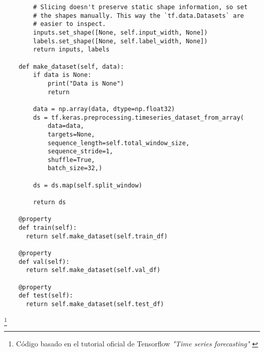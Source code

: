 \begin{verbatim}
        # Slicing doesn't preserve static shape information, so set
        # the shapes manually. This way the `tf.data.Datasets` are
        # easier to inspect.
        inputs.set_shape([None, self.input_width, None])
        labels.set_shape([None, self.label_width, None])
        return inputs, labels
    
    def make_dataset(self, data):
        if data is None:
            print("Data is None")
            return
    
        data = np.array(data, dtype=np.float32)
        ds = tf.keras.preprocessing.timeseries_dataset_from_array(
            data=data,
            targets=None,
            sequence_length=self.total_window_size,
            sequence_stride=1,
            shuffle=True,
            batch_size=32,)
    
        ds = ds.map(self.split_window)
    
        return ds
    
    @property
    def train(self):
      return self.make_dataset(self.train_df)
    
    @property
    def val(self):
      return self.make_dataset(self.val_df)
    
    @property
    def test(self):
      return self.make_dataset(self.test_df)
\end{verbatim}

\footnote{Código basado en el tutorial oficial de Tensorflow \textit{"Time series forecasting"} \cite{tensorflow2015-whitepaper}}